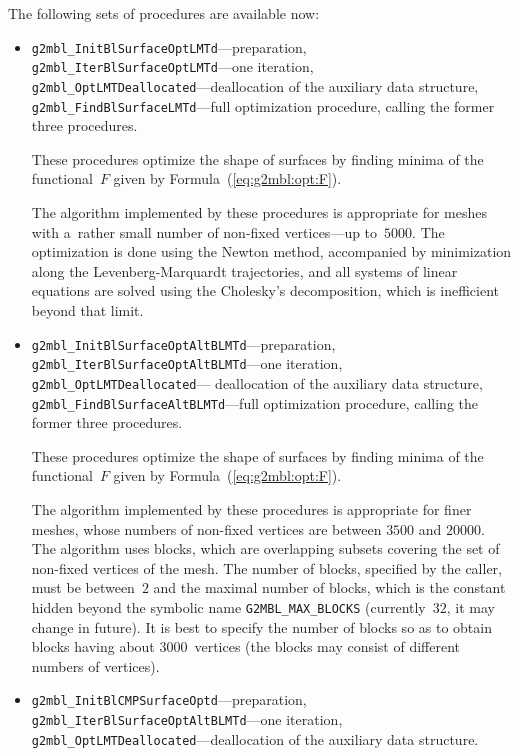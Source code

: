 The following sets of procedures are available now:
\begin{itemize}
\item \texttt{g2mbl\_InitBlSurfaceOptLMTd}---preparation, \\
  \texttt{g2mbl\_IterBlSurfaceOptLMTd}---one iteration, \\
  \texttt{g2mbl\_OptLMTDeallocated}---deallocation of the auxiliary data
    structure, \\
  \texttt{g2mbl\_FindBlSurfaceLMTd}---full optimization procedure,
    calling the former three procedures.

  These procedures optimize the shape of surfaces by finding minima of
  the functional~$F$ given by Formula~(\ref{eq:g2mbl:opt:F}).

  The algorithm implemented by these procedures is appropriate for meshes
  with a~rather small number of non-fixed vertices---up to~$5000$. The
  optimization is done using the Newton method, accompanied by minimization
  along the Levenberg-Marquardt trajectories, and all systems of linear
  equations are solved using the Cholesky's decomposition, which is
  inefficient beyond that limit.
\item \texttt{g2mbl\_InitBlSurfaceOptAltBLMTd}---preparation, \\
  \texttt{g2mbl\_IterBlSurfaceOptAltBLMTd}---one iteration, \\
  \texttt{g2mbl\_OptLMTDeallocated}--- deallocation of the auxiliary data
    structure, \\
  \texttt{g2mbl\_FindBlSurfaceAltBLMTd}---full optimization procedure,
    calling the former three procedures.

  These procedures optimize the shape of surfaces by finding minima of
  the functional~$F$ given by Formula~(\ref{eq:g2mbl:opt:F}).

  The algorithm implemented by these procedures is appropriate for finer
  meshes, whose numbers of non-fixed vertices are between $3500$ and
  $20000$. The algorithm uses blocks, which are overlapping subsets covering
  the set of non-fixed vertices of the mesh. The number of blocks, specified
  by the caller, must be between~$2$ and the maximal number of blocks, which
  is the constant hidden beyond the symbolic name \texttt{G2MBL\_MAX\_BLOCKS}
  (currently~$32$, it may change in future). It is best to specify the
  number of blocks so as to obtain blocks having about $3000$~vertices
  (the blocks may consist of different numbers of vertices).
\item \texttt{g2mbl\_InitBlCMPSurfaceOptd}---preparation, \\
  \texttt{g2mbl\_IterBlSurfaceOptAltBLMTd}---one iteration, \\
  \texttt{g2mbl\_OptLMTDeallocated}---deallocation of the auxiliary data
    structure.


\end{itemize}
